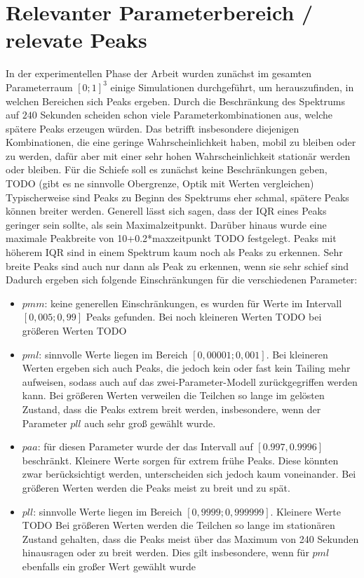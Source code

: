 \section{Relevanter Parameterbereich / relevate Peaks}
In der experimentellen Phase der Arbeit wurden zunächst im gesamten Parameterraum $[0;1]^3$ einige Simulationen durchgeführt, um herauszufinden, in welchen Bereichen sich Peaks ergeben. 
Durch die Beschränkung des Spektrums auf $240$ Sekunden scheiden schon viele Parameterkombinationen aus, welche spätere Peaks erzeugen würden. Das betrifft insbesondere diejenigen Kombinationen, die eine geringe Wahrscheinlichkeit haben, mobil zu bleiben oder zu werden, dafür aber mit einer sehr hohen Wahrscheinlichkeit stationär werden oder bleiben. 
Für die Schiefe soll es zunächst keine Beschränkungen geben, TODO (gibt es ne sinnvolle Obergrenze, Optik mit Werten vergleichen)
Typischerweise sind Peaks zu Beginn des Spektrums eher schmal, spätere Peaks können breiter werden. Generell lässt sich sagen, dass der IQR eines Peaks geringer sein sollte, als sein Maximalzeitpunkt. Darüber hinaus wurde eine maximale Peakbreite von 10+0.2*maxzeitpunkt TODO festgelegt. Peaks mit höherem IQR sind in einem Spektrum kaum noch als Peaks zu erkennen.
Sehr breite Peaks sind auch nur dann als Peak zu erkennen, wenn sie sehr schief sind
Dadurch ergeben sich folgende Einschränkungen für die verschiedenen Parameter:
\begin{itemize}
 \item $pmm$: keine generellen Einschränkungen, es wurden für Werte im Intervall $[0,005; 0,99]$ Peaks gefunden. Bei noch kleineren Werten TODO bei größeren Werten TODO
 \item $pml$: sinnvolle Werte liegen im Bereich $[0,00001; 0,001]$. Bei kleineren Werten ergeben sich auch Peaks, die jedoch kein oder fast kein Tailing mehr aufweisen, sodass auch auf das zwei-Parameter-Modell zurückgegriffen werden kann. Bei größeren Werten verweilen die Teilchen so lange im gelösten Zustand, dass die Peaks extrem breit werden, insbesondere, wenn der Parameter $pll$ auch sehr groß gewählt wurde.
 \item $paa$: für diesen Parameter wurde der das Intervall auf $[0.997, 0.9996]$ beschränkt. Kleinere Werte sorgen für extrem frühe Peaks. Diese könnten zwar berücksichtigt werden, unterscheiden sich jedoch kaum voneinander. Bei größeren Werten werden die Peaks meist zu breit und zu spät. 
 \item $pll$: sinnvolle Werte liegen im Bereich $[0,9999; 0,999999]$. Kleinere Werte TODO Bei größeren Werten werden die Teilchen so lange im stationären Zustand gehalten, dass die Peaks meist über das Maximum von 240 Sekunden hinausragen oder zu breit werden. Dies gilt insbesondere, wenn für $pml$ ebenfalls ein großer Wert gewählt wurde
\end{itemize}


